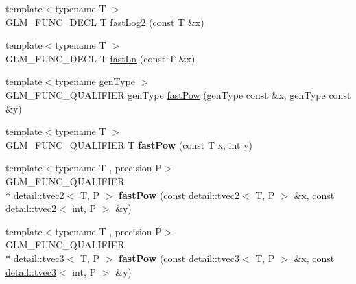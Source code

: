 \begin{DoxyCompactItemize}
\item 
{\footnotesize template$<$typename T $>$ }\\G\-L\-M\-\_\-\-F\-U\-N\-C\-\_\-\-D\-E\-C\-L T \hyperlink{group__gtx__fast__exponential_gadff374a7349142c0ae65f476b9bf4886}{fast\-Log2} (const T \&x)
\item 
{\footnotesize template$<$typename T $>$ }\\G\-L\-M\-\_\-\-F\-U\-N\-C\-\_\-\-D\-E\-C\-L T \hyperlink{group__gtx__fast__exponential_ga8f27c4779039f88ae790a9a69be01630}{fast\-Ln} (const T \&x)
\item 
{\footnotesize template$<$typename gen\-Type $>$ }\\G\-L\-M\-\_\-\-F\-U\-N\-C\-\_\-\-Q\-U\-A\-L\-I\-F\-I\-E\-R gen\-Type \hyperlink{group__gtx__fast__exponential_ga842ec5e981c76f8aae7ae14972795378}{fast\-Pow} (gen\-Type const \&x, gen\-Type const \&y)
\item 
\hypertarget{namespaceglm_a2aaec425ec510772b4611f75b9b5f67b}{{\footnotesize template$<$typename T $>$ }\\G\-L\-M\-\_\-\-F\-U\-N\-C\-\_\-\-Q\-U\-A\-L\-I\-F\-I\-E\-R T {\bfseries fast\-Pow} (const T x, int y)}\label{namespaceglm_a2aaec425ec510772b4611f75b9b5f67b}

\item 
\hypertarget{namespaceglm_a91a0f63bf5d10bb64f4f50df7a102d14}{{\footnotesize template$<$typename T , precision P$>$ }\\G\-L\-M\-\_\-\-F\-U\-N\-C\-\_\-\-Q\-U\-A\-L\-I\-F\-I\-E\-R \\*
\hyperlink{structglm_1_1detail_1_1tvec2}{detail\-::tvec2}$<$ T, P $>$ {\bfseries fast\-Pow} (const \hyperlink{structglm_1_1detail_1_1tvec2}{detail\-::tvec2}$<$ T, P $>$ \&x, const \hyperlink{structglm_1_1detail_1_1tvec2}{detail\-::tvec2}$<$ int, P $>$ \&y)}\label{namespaceglm_a91a0f63bf5d10bb64f4f50df7a102d14}

\item 
\hypertarget{namespaceglm_a82f246b4681436e1a32c28e5e967f48d}{{\footnotesize template$<$typename T , precision P$>$ }\\G\-L\-M\-\_\-\-F\-U\-N\-C\-\_\-\-Q\-U\-A\-L\-I\-F\-I\-E\-R \\*
\hyperlink{structglm_1_1detail_1_1tvec3}{detail\-::tvec3}$<$ T, P $>$ {\bfseries fast\-Pow} (const \hyperlink{structglm_1_1detail_1_1tvec3}{detail\-::tvec3}$<$ T, P $>$ \&x, const \hyperlink{structglm_1_1detail_1_1tvec3}{detail\-::tvec3}$<$ int, P $>$ \&y)}\label{namespaceglm_a82f246b4681436e1a32c28e5e967f48d}


\end{DoxyCompactItemize}

